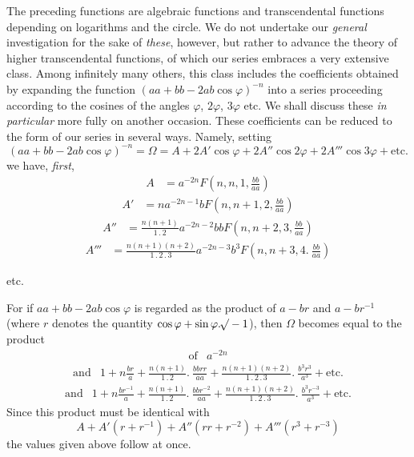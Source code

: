 The preceding functions are algebraic functions and transcendental functions depending on logarithms and the circle. We do not undertake our \textit{general} investigation for the sake of \textit{these}, however, but rather to advance the theory of higher transcendental functions, of which our series embraces a very extensive class. Among infinitely many others, this class includes the coefficients obtained by expanding the function $(aa+bb-2ab\cos\varphi)^{-n}$ into a series proceeding according to the cosines of the angles $\varphi$, $2\varphi$, $3\varphi$ etc. We shall discuss these \textit{in particular} more fully on another occasion. These coefficients can be reduced to the form of our series in several ways. Namely, setting
\[
(aa+bb-2ab\cos\varphi)^{-n}=\Omega=A+2A'\cos\varphi+2A''\cos2\varphi+2A'''\cos3\varphi+\mbox{etc.}
\]
we have, \textit{first},
\[
\begin{array}{rl}
A&=a^{-2n}F(n,n,1,\frac{bb}{aa})
\end{array}
\]
\[
\begin{array}{rl}
A'&=na^{-2n-1}bF(n,n+1,2,\frac{bb}{aa})
\end{array}
\]
\[
\begin{array}{rl}
A''&=\frac{n(n+1)}{1\mathbin{.}2}a^{-2n-2}bbF(n,n+2,3,\frac{bb}{aa})
\end{array}
\]
\[
\begin{array}{rl}
A'''&=\frac{n(n+1)(n+2)}{1\mathbin{.}2\mathbin{.}3}a^{-2n-3}b^3F(n,n+3,4.\ \frac{bb}{aa})
\end{array}
\]
\begin{center}etc.\end{center}
For if $aa+bb-2ab\cos\varphi$ is regarded as the product of $a-br$ and $a-br^{-1}$ (where $r$ denotes the quantity $\cos\varphi+\sin\varphi.\mathord{{}^{}\!\surd}-1$), then $\Omega$ becomes equal to the product
\[
\begin{array}{rl}
\mbox{of}&a^{-2n}
\end{array}
\]
\[
\begin{array}{rl}
\mbox{and}&1+n\frac{br}{a}+\frac{n(n+1)}{1\mathbin{.}2}.\ \frac{bbrr}{aa}+\frac{n(n+1)(n+2)}{1\mathbin{.}2\mathbin{.}3}.\ \frac{b^3r^3}{a^3}+\mbox{etc.}
\end{array}
\]
\[
\begin{array}{rl}
\mbox{and}&1+n\frac{br^{-1}}{a}+\frac{n(n+1)}{1\mathbin{.}2}.\ \frac{bbr^{-2}}{aa}+\frac{n(n+1)(n+2)}{1\mathbin{.}2\mathbin{.}3}.\ \frac{b^3r^{-3}}{a^3}+\mbox{etc.}
\end{array}
\]
Since this product must be identical with
\[
A+A'(r+r^{-1})+A''(rr+r^{-2})+A'''(r^3+r^{-3})
\]
the values given above follow at once.

